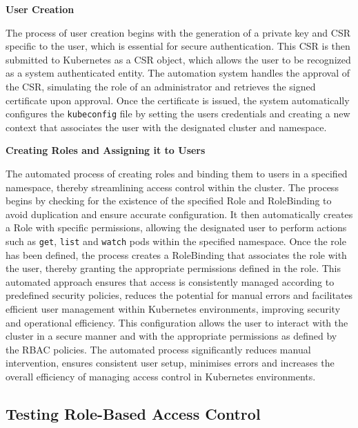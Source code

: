 \textbf{User Creation}

The process of user creation begins with the generation of a private key and CSR specific to the user, which is essential for secure authentication. This CSR is then submitted to Kubernetes as a CSR object, which allows the user to be recognized as a system authenticated entity. The automation system handles the approval of the CSR, simulating the role of an administrator and retrieves the signed certificate upon approval. Once the certificate is issued, the system automatically configures the \texttt{kubeconfig} file by setting the users credentials and creating a new context that associates the user with the designated cluster and namespace. \cite{Kubernetes_doc}

\textbf{Creating Roles and Assigning it to Users}

The automated process of creating roles and binding them to users in a specified namespace, thereby streamlining access control within the cluster. The process begins by checking for the existence of the specified Role and RoleBinding to avoid duplication and ensure accurate configuration. It then automatically creates a Role with specific permissions, allowing the designated user to perform actions such as \texttt{get}, \texttt{list} and \texttt{watch} pods within the specified namespace. Once the role has been defined, the process creates a RoleBinding that associates the role with the user, thereby granting the appropriate permissions defined in the role. This automated approach ensures that access is consistently managed according to predefined security policies, reduces the potential for manual errors and facilitates efficient user management within Kubernetes environments, improving security and operational efficiency. This configuration allows the user to interact with the cluster in a secure manner and with the appropriate permissions as defined by the RBAC policies. The automated process significantly reduces manual intervention, ensures consistent user setup, minimises errors and increases the overall efficiency of managing access control in Kubernetes environments. \cite{Kubernetes_doc}

\subsection{Testing Role-Based Access Control}

